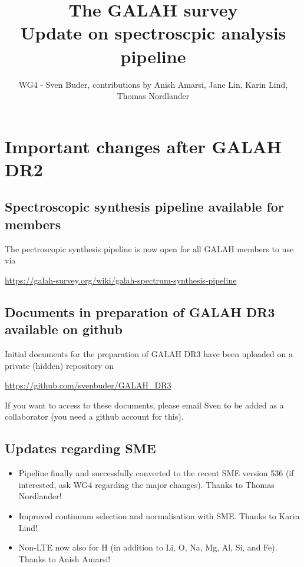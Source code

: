 \documentclass[a4paper,11pt,english]{article}
\begin{document}
\title{\textbf{The GALAH survey} \\ Update on spectroscpic analysis pipeline}
\author{WG4 - Sven Buder, contributions by Anish Amarsi, Jane Lin, Karin Lind, Thomas Nordlander}

\maketitle

\section{Important changes after GALAH DR2}

\subsection{Spectroscopic synthesis pipeline available for members}

The pectroscopic synthesis pipeline is now open for all GALAH members to use via

\url{https://galah-survey.org/wiki/galah-spectrum-synthesis-pipeline}

\subsection{Documents in preparation of GALAH DR3 available on github}

Initial documents for the preparation of GALAH DR3 have been uploaded on a private (hidden) repository on

\url{https://github.com/svenbuder/GALAH_DR3}

If you want to access to these documents, please email Sven to be added as a collaborator (you need a github account for this).

\subsection{Updates regarding SME}

\begin{itemize}
\item Pipeline finally and successfully converted to the recent SME version 536 (if interested, ask WG4 regarding the major changes). Thanks to Thomas Nordlander!
\item Improved continuum selection and normalisation with SME. Thanks to Karin Lind!
\item Non-LTE now also for H (in addition to Li, O, Na, Mg, Al, Si, and Fe). Thanks to Anish Amarsi!
\end{itemize}
\end{document}
